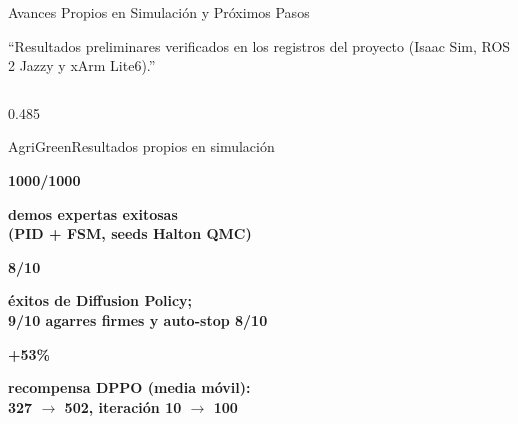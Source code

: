 \documentclass[aspectratio=169,10pt,xcolor={dvipsnames,table}]{beamer}
\newcommand{\BannerFont}{\fontsize{7.5}{9.2}\selectfont\bfseries}       %
\newcommand{\KpiNumberFont}{\fontsize{11}{12.5}\selectfont\bfseries}    %
\newcommand{\KpiLabelFont}{\fontsize{5.2}{6.5}\selectfont\bfseries}     %
\newcommand{\BannerArc}{1.5pt}             %
\newcommand{\BannerRule}{0.5pt}            %
\newcommand{\BannerLeftRule}{2.5pt}        %
\newcommand{\CardHeightTall}{46mm}         %
\newcommand{\BannerCentral}[2][UCNCyan]{%
  \begin{tcolorbox}[
    enhanced,
    colback=#1!10,
    colframe=#1,
    boxrule=\BannerRule,
    leftrule=\BannerLeftRule,
    arc=\BannerArc,
    top=0.35mm, bottom=0.35mm, left=2mm, right=2mm
  ]
    {\BannerFont\raggedright\textcolor{UCNBlue}{#2}\par}
  \end{tcolorbox}%
  \vspace{-2.5mm}%
}
\begin{document}
\begin{frame}{Avances Propios en Simulación y Próximos Pasos}
  \BannerCentral[UCNBlue]{``Resultados preliminares verificados en los registros del proyecto (Isaac Sim, ROS 2 Jazzy y xArm Lite6).''}
  \vspace{0.8mm}
  \begin{columns}[T, onlytextwidth]
    \begin{column}{0.485\textwidth}
      \begin{Card}[height=\CardHeightTall]{AgriGreen}{Resultados propios en simulación}
        \centering
        \begin{minipage}[t]{0.48\linewidth}\centering
          {\KpiNumberFont\textcolor{AgriGreenDark}{1000/1000}}\par\vspace{0.3mm}
          {\KpiLabelFont\textcolor{TextDark!80}{demos expertas exitosas\\(PID + FSM, seeds Halton QMC)}\par}
        \end{minipage}\hfill
        \begin{minipage}[t]{0.48\linewidth}\centering
          {\KpiNumberFont\textcolor{AgriGreenDark}{8/10}}\par\vspace{0.3mm}
          {\KpiLabelFont\textcolor{TextDark!80}{éxitos de Diffusion Policy;\\9/10 agarres firmes y auto-stop 8/10}\par}
        \end{minipage}\par\vspace{2.5mm}
        \begin{minipage}[t]{0.48\linewidth}\centering
          {\KpiNumberFont\textcolor{AgriGreenDark}{+53\%}}\par\vspace{0.3mm}
          {\KpiLabelFont\textcolor{TextDark!80}{recompensa DPPO (media móvil):\\327 $\to$ 502, iteración 10 $\to$ 100}\par}

\end{minipage}
\end{Card}
\end{column}
\end{columns}
\end{frame}
\end{document}
